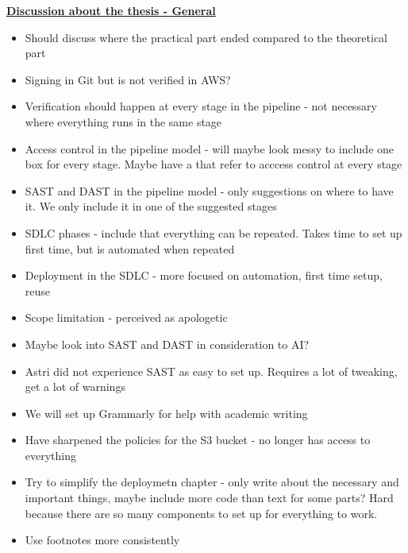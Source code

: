 \textbf{\underline{Discussion about the thesis - General}}
\begin{itemize}
    \item Should discuss where the practical part ended compared to the theoretical part
    \item Signing in Git but is not verified in AWS? 
    \item Verification should happen at every stage in the pipeline - not necessary where everything runs in the same stage
    \item Access control in the pipeline model - will maybe look messy to include one box for every stage. Maybe have a  that refer to acccess control at every stage
    \item SAST and DAST in the pipeline model - only suggestions on where to have it. We only include it in one of the suggested stages
    \item SDLC phases - include that everything can be repeated. Takes time to set up first time, but is automated when repeated
    \item Deployment in the SDLC - more focused on automation, first time setup, reuse
    \item Scope limitation - perceived as apologetic
    \item Maybe look into SAST and DAST in consideration to AI?
    \item Astri did not experience SAST as easy to set up. Requires a lot of tweaking, get a lot of warnings
    \item We will set up Grammarly for help with academic writing
    \item Have sharpened the policies for the S3 bucket - no longer has access to everything
    \item Try to simplify the deploymetn chapter - only write about the necessary and important things, maybe include more code than text for some parts? Hard because there are so many components to set up for everything to work.
    \item Use footnotes more consistently 
\end{itemize}